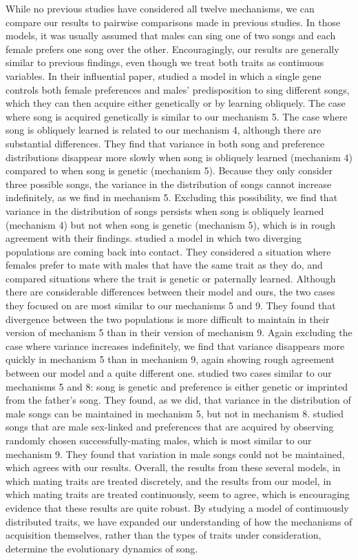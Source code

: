 \documentclass[12pt]{article}
\begin{document}
While no previous studies have considered all twelve mechanisms, we can compare our results to pairwise comparisons made in previous studies. In those models, it was usually assumed that males can sing one of two songs and each female prefers one song over the other. Encouragingly, our results are generally similar to previous findings, even though we treat both traits as continuous variables. In their influential paper, \citet{Lachlan:2004tg} studied a model in which a single gene controls both female preferences and males' predisposition to sing different songs, which they can then acquire either genetically or by learning obliquely. The case where song is acquired genetically is similar to our mechanism 5. The case where song is obliquely learned is related to our mechanism 4, although there are substantial differences. They find that variance in both song and preference distributions disappear more slowly when song is obliquely learned (mechanism 4) compared to when song is genetic (mechanism 5). Because they only consider three possible songs, the variance in the distribution of songs cannot increase indefinitely, as we find in mechanism 5. Excluding this possibility, we find that variance in the distribution of songs persists when song is obliquely learned (mechanism 4) but not when song is genetic (mechanism 5), which is in rough agreement with their findings.   \citet{Yeh:2015bh} studied a model in which two diverging populations are coming back into contact. They considered a situation where females prefer to mate with males that have the same trait as they do, and compared situations where the trait is genetic or paternally learned. Although there are considerable differences between their model and ours, the two cases they focused on are most similar to our mechanisms 5 and 9. They found that divergence between the two populations is more difficult to maintain in their version of mechanism 5 than in their version of mechanism 9. Again excluding the case where variance increases indefinitely, we find that variance disappears more quickly in mechanism 5 than in mechanism 9, again showing rough agreement between our model and a quite different one. \citet{Verzijden:2005vn} studied two cases similar to our mechanisms 5 and 8: song is genetic and preference is either genetic or imprinted from the father's song. They found, as we did, that variance in the distribution of male songs can be maintained in mechanism 5, but not in mechanism 8. \citet{Kirkpatrick:1994vn} studied songs that are male sex-linked and preferences that are acquired by observing randomly chosen successfully-mating males, which is most similar to our mechanism 9. They found that variation in male songs could not be maintained, which agrees with our results. Overall, the results from these several models, in which mating traits are treated discretely, and the results from our model, in which mating traits are treated continuously, seem to agree, which is encouraging evidence that these results are quite robust. By studying a model of continuously distributed traits, we have expanded our understanding of how the mechanisms of acquisition themselves, rather than the types of traits under consideration, determine the evolutionary dynamics of song.
\end{document}
